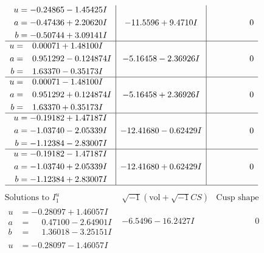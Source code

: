 \documentclass[1p]{elsarticle_modified}
\theoremstyle{definition}
\newcommand{\I}{\sqrt{-1}}
\begin{document}
$$\begin{array}{c|c|c}
\begin{aligned}
u &= -0.24865 - 1.45425 I \\
a &= -0.47436 + 2.20620 I \\
b &= -0.50744 + 3.09141 I\end{aligned}
 & -11.5596 + 9.4710 I & \phantom{-0.000000 } 0 \\ \hline\begin{aligned}
u &= \phantom{-}0.00071 + 1.48100 I \\
a &= \phantom{-}0.951292 - 0.124874 I \\
b &= \phantom{-}1.63370 - 0.35173 I\end{aligned}
 & -5.16458 - 2.36926 I & \phantom{-0.000000 } 0 \\ \hline\begin{aligned}
u &= \phantom{-}0.00071 - 1.48100 I \\
a &= \phantom{-}0.951292 + 0.124874 I \\
b &= \phantom{-}1.63370 + 0.35173 I\end{aligned}
 & -5.16458 + 2.36926 I & \phantom{-0.000000 } 0 \\ \hline\begin{aligned}
u &= -0.19182 + 1.47187 I \\
a &= -1.03740 - 2.05339 I \\
b &= -1.12384 - 2.83007 I\end{aligned}
 & -12.41680 - 0.62429 I & \phantom{-0.000000 } 0 \\ \hline\begin{aligned}
u &= -0.19182 - 1.47187 I \\
a &= -1.03740 + 2.05339 I \\
b &= -1.12384 + 2.83007 I\end{aligned}
 & -12.41680 + 0.62429 I & \phantom{-0.000000 } 0\\
 \hline 
 \end{array}$$\newpage$$\begin{array}{c|c|c}  
\text{Solutions to }I^u_{1}& \I (\text{vol} + \sqrt{-1}CS) & \text{Cusp shape}\\
 \hline 
\begin{aligned}
u &= -0.28097 + 1.46057 I \\
a &= \phantom{-}0.47100 - 2.64901 I \\
b &= \phantom{-}1.36018 - 3.25151 I\end{aligned}
 & -6.5496 - 16.2427 I & \phantom{-0.000000 } 0 \\ \hline\begin{aligned}
u &= -0.28097 - 1.46057 I \\

\end{aligned}
\end{array}$$
\end{document}
